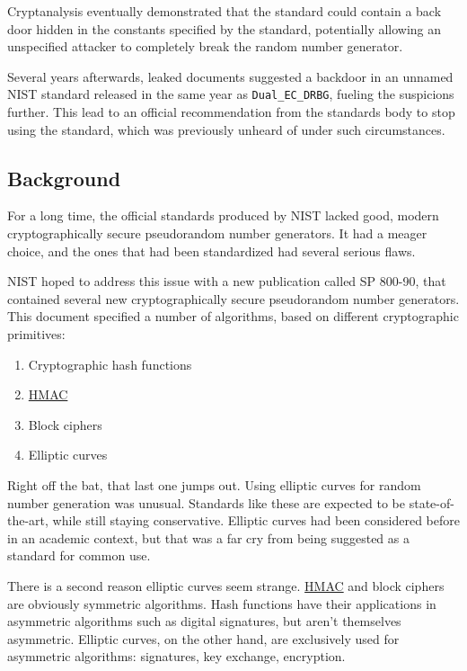 \documentclass[11pt,ebook,table,dvipsnames]{memoir}
\begin{document}
Cryptanalysis eventually demonstrated that the standard could contain
a back door hidden in the constants specified by the standard,
potentially allowing an unspecified attacker to completely break the
random number generator.

Several years afterwards, leaked documents suggested a backdoor in an
unnamed NIST standard released in the same year as \verb~Dual_EC_DRBG~,
fueling the suspicions further. This lead to an official
recommendation from the standards body to stop using the standard,
which was previously unheard of under such circumstances.

\subsection{Background}
\label{sec-2-10-5-1}

For a long time, the official standards produced by NIST lacked good,
modern cryptographically secure pseudorandom number generators. It had
a meager choice, and the ones that had been standardized had several
serious flaws.

NIST hoped to address this issue with a new publication called SP
800-90, that contained several new cryptographically secure
pseudorandom number generators. This document specified a number of
algorithms, based on different cryptographic primitives:

\begin{enumerate}
\item Cryptographic hash functions
\item \hyperref[HMAC]{HMAC}
\item Block ciphers
\item Elliptic curves
\end{enumerate}

Right off the bat, that last one jumps out. Using elliptic curves for
random number generation was unusual. Standards like these are
expected to be state-of-the-art, while still staying conservative.
Elliptic curves had been considered before in an academic context, but
that was a far cry from being suggested as a standard for common use.

There is a second reason elliptic curves seem strange. \hyperref[HMAC]{HMAC} and block
ciphers are obviously symmetric algorithms. Hash functions have their
applications in asymmetric algorithms such as digital signatures, but
aren't themselves asymmetric. Elliptic curves, on the other hand, are
exclusively used for asymmetric algorithms: signatures, key exchange,
encryption.
\end{document}
